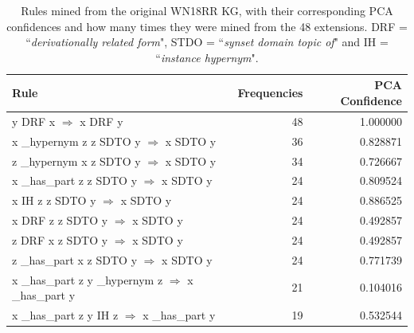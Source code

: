 \begin{table}
\begin{tabular}{lrr}
\toprule
                                                                                                      Rule &  Frequencies &  PCA Confidence \\
\midrule
                            y  DRF  x   $\Rightarrow$ x  DRF  y &           48 &        1.000000 \\
                   x  \_hypernym  z  z  SDTO  y   $\Rightarrow$ x  SDTO  y &           36 &        0.828871 \\
                   z  \_hypernym  x  z  SDTO  y   $\Rightarrow$ x  SDTO  y &           34 &        0.726667 \\
                   x  \_has\_part  z  z  SDTO  y   $\Rightarrow$ x  SDTO  y &           24 &        0.809524 \\
          x  IH  z  z  SDTO  y   $\Rightarrow$ x  SDTO  y &           24 &        0.886525 \\
x  DRF  z  z  SDTO  y   $\Rightarrow$ x  SDTO  y &           24 &        0.492857 \\
z  DRF  x  z  SDTO  y   $\Rightarrow$ x  SDTO  y &           24 &        0.492857 \\
                   z  \_has\_part  x  z  SDTO  y   $\Rightarrow$ x  SDTO  y &           24 &        0.771739 \\
                                               x  \_has\_part  z  y  \_hypernym  z   $\Rightarrow$ x  \_has\_part  y &           21 &        0.104016 \\
                                      x  \_has\_part  z  y  IH  z   $\Rightarrow$ x  \_has\_part  y &           19 &        0.532544 \\
\bottomrule
\end{tabular}
\caption{Rules mined from the original WN18RR KG, with their corresponding PCA confidences and how many times they were mined from the 48 extensions. DRF = ``\textit{derivationally related form}", STDO = ``\textit{synset domain topic of}" and IH = ``\textit{instance hypernym}".}
\label{wn18rr_original_rules_table_frequencies}
\end{table}

